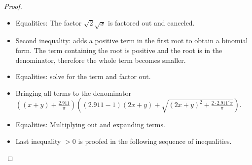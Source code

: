 \documentclass{article}
\begin{document}
\begin{proof}
\begin{itemize}
\item Equalities: The factor $\sqrt{2} \sqrt{x}$ is factored out and
  canceled. 

\item Second inequality: adds a positive term in the first root to
  obtain a binomial form. The term containing the root 
is positive and the root is in the denominator, 
therefore the whole term becomes smaller.

\item Equalities: solve for the term and factor out.

\item Bringing all terms to the denominator
$\left((x+y)+\frac{2.911}{\pi }\right) \left((2.911 -1) (2 x+y)+\sqrt{(2 x+y)^2+\frac{2 \cdot 2.911^2 x}{\pi }}\right)$.

\item Equalities: Multiplying out and expanding terms.

\item Last inequality $>0$ is proofed in the following sequence of
  inequalities.
\end{itemize}


\end{proof}
\end{document}
